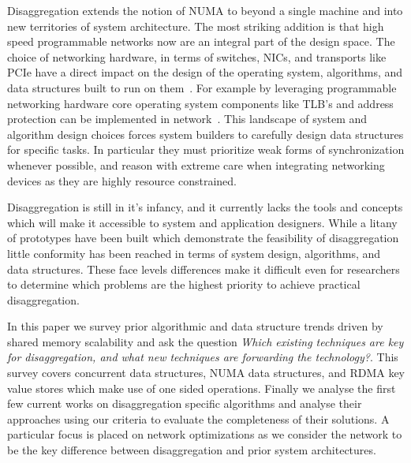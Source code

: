 Disaggregation extends the notion of NUMA to beyond a single machine and into
new territories of system architecture. The most striking addition is that high
speed programmable networks now are an integral part of the design space. The
choice of networking hardware, in terms of switches, NICs, and transports like
PCIe have a direct impact on the design of the operating system, algorithms, and
data structures built to run on
them~\cite{dredbox,firebox,machine,legoos,supernic}. For example by leveraging
programmable networking hardware core operating system components like TLB's and
address protection can be implemented in network~\cite{mind}.  This landscape of
system and algorithm design choices forces system builders to carefully design
data structures for specific tasks.  In particular they must prioritize weak
forms of synchronization whenever possible, and reason with extreme care when
integrating networking devices as they are highly resource constrained.


Disaggregation is still in it's infancy, and it currently lacks the tools and
concepts which will make it accessible to system and application designers.
While a litany of prototypes have been built which demonstrate the feasibility
of
disaggregation~\cite{infiniswap,fastswap,leap,legoos,aifm,kona,reigons,software-far,lite,semeru}
little conformity has been reached in terms of system design, algorithms, and
data structures. These face levels differences make it difficult even for
researchers to determine which problems are the highest priority to achieve
practical disaggregation.

In this paper we survey prior algorithmic and data structure trends driven by
shared memory scalability and ask the question \textit{Which existing techniques
are key for disaggregation, and what new techniques are forwarding the
technology?}. This survey covers concurrent data structures, NUMA data
structures, and RDMA key value stores which make use of one sided operations.
Finally we analyse the first few current works on disaggregation specific
algorithms and analyse their approaches using our criteria to evaluate the
completeness of their solutions.  A particular focus is placed on network
optimizations as we consider the network to be the key difference between
disaggregation and prior system architectures.

